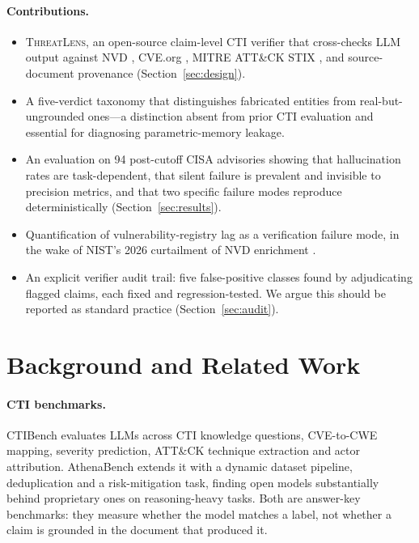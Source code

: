 \documentclass[10pt,twocolumn]{article}
\newcommand{\tool}{\textsc{ThreatLens}\xspace}
\begin{document}
\paragraph{Contributions.}
\begin{itemize}\itemsep2pt
\item \tool, an open-source claim-level CTI verifier that cross-checks LLM
      output against NVD \cite{nvdapi}, CVE.org \cite{cveorg}, MITRE ATT\&CK
      STIX \cite{attackstix}, and source-document provenance
      (Section~\ref{sec:design}).
\item A five-verdict taxonomy that distinguishes fabricated entities from
      real-but-ungrounded ones---a distinction absent from prior CTI
      evaluation and essential for diagnosing parametric-memory leakage.
\item An evaluation on 94 post-cutoff CISA advisories showing that
      hallucination rates are task-dependent, that silent failure is prevalent
      and invisible to precision metrics, and that two specific failure modes
      reproduce deterministically (Section~\ref{sec:results}).
\item Quantification of vulnerability-registry lag as a verification failure
      mode, in the wake of NIST's 2026 curtailment of NVD enrichment
      \cite{nist2026nvd,helpnet2026nvd}.
\item An explicit verifier audit trail: five false-positive classes found by
      adjudicating flagged claims, each fixed and regression-tested. We argue
      this should be reported as standard practice
      (Section~\ref{sec:audit}).
\end{itemize}

\section{Background and Related Work}

\paragraph{CTI benchmarks.}
CTIBench \cite{alam2024ctibench} evaluates LLMs across CTI knowledge questions,
CVE-to-CWE mapping, severity prediction, ATT\&CK technique extraction and
actor attribution. AthenaBench \cite{alam2025athenabench} extends it with a
dynamic dataset pipeline, deduplication and a risk-mitigation task, finding
open models substantially behind proprietary ones on reasoning-heavy tasks.
Both are answer-key benchmarks: they measure whether the model matches a label,
not whether a claim is grounded in the document that produced it.
\end{document}
